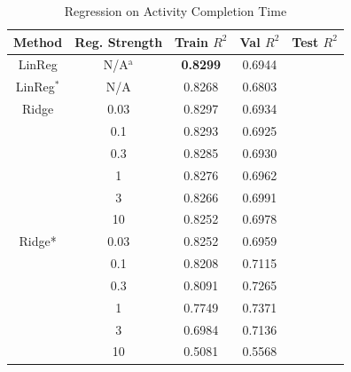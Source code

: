 \documentclass[conference]{IEEEtran}
\begin{document}
\begin{table}[htbp]
    \caption{Regression on Activity Completion Time}
    \begin{center}
        \begin{tabular}{|c|c|c|c|c|}
            \hline
            \textbf{Method} & \textbf{Reg. Strength} & \textbf{Train $R^2$} & \textbf{Val $R^2$} & \textbf{Test $R^2$} \\
            \hline
            LinReg          & N/A$^{\mathrm{a}}$     & \textbf{0.8299}      & 0.6944             &                     \\
            LinReg$^*$      & N/A                    & 0.8268               & 0.6803             &                     \\
            \hline
            Ridge           & 0.03                   & 0.8297               & 0.6934             &                     \\
                            & 0.1                    & 0.8293               & 0.6925             &                     \\
                            & 0.3                    & 0.8285               & 0.6930             &                     \\
                            & 1                      & 0.8276               & 0.6962             &                     \\
                            & 3                      & 0.8266               & 0.6991             &                     \\
                            & 10                     & 0.8252               & 0.6978             &                     \\
            \hline
            Ridge*          & 0.03                   & 0.8252               & 0.6959             &                     \\
                            & 0.1                    & 0.8208               & 0.7115             &                     \\
                            & 0.3                    & 0.8091               & 0.7265             &                     \\
                            & 1                      & 0.7749               & 0.7371             &                     \\
                            & 3                      & 0.6984               & 0.7136             &                     \\
                            & 10                     & 0.5081               & 0.5568             &                     \\


\end{tabular}
\end{center}
\end{table}
\end{document}

